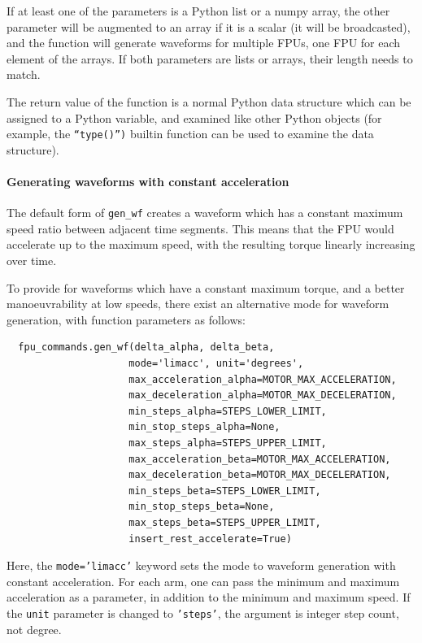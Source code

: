 \documentclass[11pt,a4paper]{scrartcl}
\begin{document}
%
If at least one of the parameters is a Python list or a numpy array,
the other parameter will be augmented to an array if it is a scalar
(it will be broadcasted), and the function will generate waveforms for
multiple FPUs, one FPU for each element of the arrays. If both
parameters are lists or arrays, their length needs to match.

The return value of the function is a normal Python data structure
which can be assigned to a Python variable, and examined like other
Python objects (for example, the \texttt{``type()'')} builtin function
can be used to examine the data structure).

\paragraph{Generating waveforms with constant acceleration}
\label{sec:genwf:constant-acceleration}
The default form of \texttt{gen\_wf} creates a waveform which has
a constant maximum speed ratio between adjacent time segments.
This means that the FPU would accelerate up to the maximum speed,
with the resulting torque linearly increasing over time.

To provide for waveforms which have a constant maximum torque, and a
better manoeuvrability at low speeds, there exist an alternative mode
for waveform generation, with function parameters as follows:

\begin{verbatim}
  fpu_commands.gen_wf(delta_alpha, delta_beta,
                     mode='limacc', unit='degrees',
                     max_acceleration_alpha=MOTOR_MAX_ACCELERATION,
                     max_deceleration_alpha=MOTOR_MAX_DECELERATION,
                     min_steps_alpha=STEPS_LOWER_LIMIT,
                     min_stop_steps_alpha=None,
                     max_steps_alpha=STEPS_UPPER_LIMIT,
                     max_acceleration_beta=MOTOR_MAX_ACCELERATION,
                     max_deceleration_beta=MOTOR_MAX_DECELERATION,
                     min_steps_beta=STEPS_LOWER_LIMIT,
                     min_stop_steps_beta=None,
                     max_steps_beta=STEPS_UPPER_LIMIT,
                     insert_rest_accelerate=True)
\end{verbatim}

Here, the \texttt{mode='limacc'} keyword sets the mode to waveform
generation with constant acceleration. For each arm, one can pass the
minimum and maximum acceleration as a parameter, in addition to the
minimum and maximum speed. If the \texttt{unit} parameter is changed
to \texttt{'steps'}, the argument is integer step count, not degree.
\end{document}
